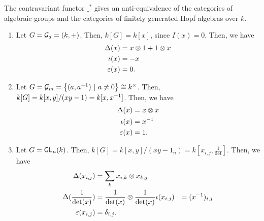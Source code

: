 \begin{theorem}
	The contravariant functor $\_^*$ gives an anti-equivalence of the categories of algebraic groups and the categories of finitely generated Hopf-algebras over $k$.
\end{theorem}

\begin{example}
\begin{enumerate}
	\item Let $G = \mathcal{G}_a = (k,+)$. Then, $k[G] = k[x]$, since $I(x) = 0$. Then, we have
	\begin{align*}
	\Delta(x) &= x \otimes 1 + 1 \otimes x\\
	\iota(x) &= -x\\
	\varepsilon(x) &= 0.
	\end{align*}
	\item Let $G = \mathcal{G}_m = \left\lbrace(a, a^{-1}) ~ | ~ a \neq 0\right\rbrace \overset{}{\cong} k^\times$. Then, $k[G] = k[x,y]/(xy - 1) = k[x,x^{-1}]$. Then, we have
	\begin{align*}
	\Delta(x) &= x \otimes x\\
	\iota(x) &= x^{-1}\\
	\varepsilon(x) &= 1.
	\end{align*}
	\item Let $G = \textsf{GL}_n(k) $. Then, $k[G] = k[x,y]/(xy - 1_n) = k[x_{i,j}, \frac{1}{\det}]$. Then, we have
	\begin{align*}
	\Delta(x_{i,j}) &= \sum_{k}x_{i,k} \otimes x_{k,j} \\
	\Delta(\frac{1}{\det(x)}) &= \frac{1}{\det(x)} \otimes \frac{1}{\det(x)}
	\iota(x_{i,j}) &= (x^{-1})_{i,j}\\
	\varepsilon(x_{i,j}) &= \delta_{i,j}.
	\end{align*}
\end{enumerate}
\end{example}